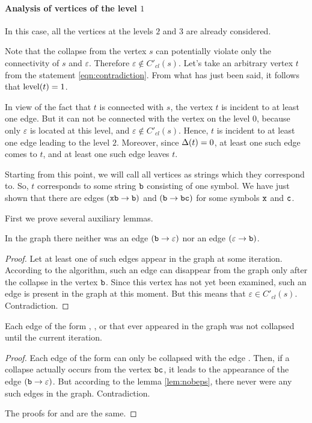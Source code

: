 \paragraph{Analysis of vertices of the level \texorpdfstring{$1$}{1}}

In this case, all the vertices at the levels $ 2 $ and $ 3 $ are already considered.

Note that the collapse from the vertex $ s $ can potentially violate only the connectivity of $ s $ and $ \varepsilon $. Therefore $ \varepsilon \notin C'_{cl} (s) $. Let's take an arbitrary vertex $ t $ from the statement \ref{eqn:contradiction}. From what has just been said, it follows that $ \operatorname{level} (t) = 1 $.

In view of the fact that $ t $ is connected with $ s $, the vertex $ t $ is incident to at least one edge. But it can not be connected with the vertex on the level $ 0 $, because only $ \varepsilon $ is located at this level, and $ \varepsilon \notin C'_{cl} (s) $. Hence, $ t $ is incident to at least one edge leading to the level $ 2 $. Moreover, since $ \operatorname{\Delta} (t) = 0 $, at least one such edge comes to $ t $, and at least one such edge leaves $ t $.

Starting from this point, we will call all vertices as strings which they correspond to. So, $ t $ corresponds to some string $ \tt b $ consisting of one symbol. We have just shown that there are edges $ ({\tt xb} \to {\tt b}) $ and $ ({\tt b} \to {\tt bc}) $ for some symbols $ {\tt x} $ and $ {\tt c} $.

First we prove several auxiliary lemmas.

\begin{lemma}
\label{lem:nobeps}
In the graph there neither was an edge $ ({\tt b} \to \varepsilon) $ nor an edge $ (\varepsilon \to {\tt b}) $.
\end{lemma}
\begin{proof}
Let at least one of such edges appear in the graph at some iteration. According to the algorithm, such an edge can disappear from the graph only after the collapse in the vertex $ {\tt b} $. Since this vertex has not yet been examined, such an edge is present in the graph at this moment. But this means that $ \varepsilon \in C'_{cl} (s) $. Contradiction.
\end{proof}

\begin{lemma}
\label{lem:bccsave}
Each edge of the form , , or  that ever appeared in the graph was not collapsed until the current iteration.
\end{lemma}
\begin{proof}
Each edge of the form  can only be collapsed with the edge . Then, if a collapse actually occurs from the vertex $ {\tt bc} $, it leads to the appearance of the edge $ ({\tt b} \to \varepsilon) $. But according to the lemma \ref{lem:nobeps}, there never were any such edges in the graph. Contradiction.

The proofs for  and  are the same.
\end{proof}

